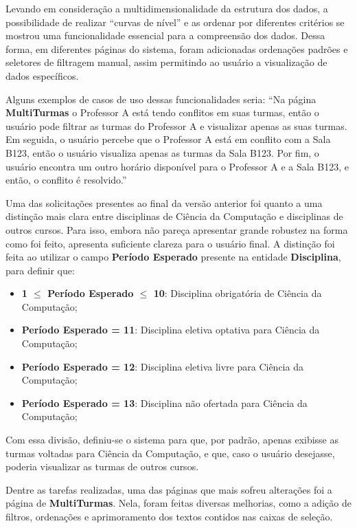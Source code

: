 Levando em consideração a multidimensionalidade da estrutura dos dados, a possibilidade de realizar ``curvas de nível'' e as ordenar por diferentes critérios se mostrou uma funcionalidade essencial para a compreensão dos dados. Dessa forma, em diferentes páginas do sistema, foram adicionadas ordenações padrões e seletores de filtragem manual, assim permitindo ao usuário a visualização de dados específicos.

Alguns exemplos de casos de uso dessas funcionalidades seria: ``Na página \textbf{MultiTurmas} o Professor A está tendo conflitos em suas turmas, então o usuário pode filtrar as turmas do Professor A e visualizar apenas as suas turmas. Em seguida, o usuário percebe que o Professor A está em conflito com a Sala B123, então o usuário visualiza apenas as turmas da Sala B123. Por fim, o usuário encontra um outro horário disponível para o Professor A e a Sala B123, e então, o conflito é resolvido.''

Uma das solicitações presentes ao final da versão anterior foi quanto a uma distinção mais clara entre disciplinas de Ciência da Computação e disciplinas de outros cursos. Para isso, embora não pareça apresentar grande robustez na forma como foi feito, apresenta suficiente clareza para o usuário final. A distinção foi feita ao utilizar o campo \textbf{Período Esperado} presente na entidade \textbf{Disciplina}, para definir que:

\begin{itemize}
  \item \textbf{1 $\leq$ Período Esperado $\leq$ 10}: Disciplina obrigatória de Ciência da Computação;
  \item \textbf{Período Esperado = 11}: Disciplina eletiva optativa para Ciência da Computação;
  \item \textbf{Período Esperado = 12}: Disciplina eletiva livre para Ciência da Computação;
  \item \textbf{Período Esperado = 13}: Disciplina não ofertada para Ciência da Computação;
\end{itemize}

Com essa divisão, definiu-se o sistema para que, por padrão, apenas exibisse as turmas voltadas para Ciência da Computação, e que, caso o usuário desejasse, poderia visualizar as turmas de outros cursos.

 \label{MultiTurmas}

Dentre as tarefas realizadas, uma das páginas que mais sofreu alterações foi a página de \textbf{MultiTurmas}. Nela, foram feitas diversas melhorias, como a adição de filtros, ordenações e aprimoramento dos textos contidos nas caixas de seleção.

